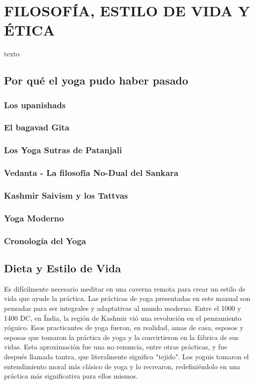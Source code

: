 \chapter{FILOSOFÍA, ESTILO DE VIDA Y ÉTICA}
texto
\section{Por qué el yoga pudo haber pasado}
\subsection{Los upanishads}
\subsection{El bagavad Gita}
\subsection{Los Yoga Sutras de Patanjali}
\subsection{Vedanta - La filosofía No-Dual del Sankara}
\subsection{Kashmir Saivism y los Tattvas}
\subsection{Yoga Moderno}
\subsection{Cronología del Yoga}
\section{Dieta y Estilo de Vida}
Es difícilmente necesario meditar en una caverna remota para crear un estilo de vida que ayude la práctica. Las prácticas de yoga presentadas en este manual son pensadas para ser integrales y adaptativas al mundo moderno. Entre el 1000 y 1400 DC, en Índia, la región de Kashmir vió una revolución en el penzamiento yóguico. Esos practicantes de yoga fueron, en realidad, amas de casa, esposos y esposas que tomaron la práctica de yoga y la convirtieron en la fábrica de sus vidas. Esta aproximación fue una no renuncia, entre otras prácticas, y fue después llamada tantra, que literalmente significa "tejido". Los yoguis tomaron el entendimiento moral más clásico de yoga y lo recrearon, redefiniéndolo en una práctica más significativa para ellos mismos.

